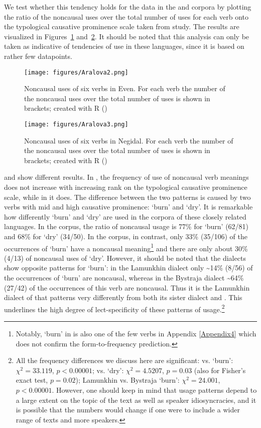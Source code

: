 \documentclass[output=paper,colorlinks,citecolor=brown]{langscibook}
\begin{document}
We test whether this tendency holds for the data in the  and  corpora by plotting the ratio of the noncausal uses over the total number of uses for each verb onto the typological causative prominence scale taken from  study. The results are visualized in Figures~\ref{fig:2:2} and~\ref{fig:2:3}. It should be noted that this analysis can only be taken as indicative of tendencies of use in these languages, since it is based on rather few datapoints. 

\begin{figure}
\texttt{[image: figures/Aralova2.png]}
\caption{Noncausal uses of six verbs in Even. For each verb the number of the noncausal uses over the total number of uses is shown in brackets; created with R (\citeyear{R2020})}
\label{fig:2:2}
\end{figure}

\begin{figure}
\texttt{[image: figures/Aralova3.png]}
\caption{Noncausal uses of six verbs in Negidal. For each verb the number of the noncausal uses over the total number of uses is shown in brackets; created with R (\citeyear{R2020})}
\label{fig:2:3}
\end{figure}

 and  show different results. In , the frequency of use of noncausal verb meanings does not increase with increasing rank on the typological causative prominence scale, while in  it does. The difference between the two patterns is caused by two verbs with mid and high causative prominence: ‘burn’ and ‘dry’. It is remarkable how differently ‘burn’ and ‘dry’ are used in the corpora of these closely related languages. In the  corpus, the ratio of noncausal usage is 77\% for ‘burn’ (62/81) and 68\% for ‘dry’ (34/50). In the  corpus, in contrast, only 33\% (35/106) of the occurrences of ‘burn’ have a noncausal meaning\footnote{Notably, ‘burn’ in  is also one of the few verbs in Appendix \ref{Appendix4} which does not confirm the form-to-frequency prediction.} and there are only about 30\% (4/13) of noncausal uses of ‘dry’. However, it should be noted that the  dialects show opposite patterns for ‘burn’: in the Lamunkhin dialect only \textasciitilde14\% (8/56) of the occurrences of ‘burn’ are noncausal, whereas in the Bystraja dialect \textasciitilde64\% (27/42) of the occurrences of this verb are noncausal. Thus it is the Lamunkhin dialect of  that patterns very differently from both its sister dialect and . This underlines the high degree of lect-specificity of these patterns of usage.\footnote{All the frequency differences we discuss here are significant:  vs.  ‘burn’: $\chi^2 =  33.119$, $p < 0.00001$;  vs.  ‘dry’: $\chi^2 =  4.5207$, $p = 0.03$ (also for Fisher’s exact test, $p = 0.02$); Lamunkhin vs. Bystraja ‘burn’: $\chi^2 = 24.001$, $p < 0.00001$. However, one should keep in mind that usage patterns depend to a large extent on the topic of the text as well as speaker idiosyncracies, and it is possible that the numbers would change if one were to include a wider range of texts and more speakers.}
\end{document}
